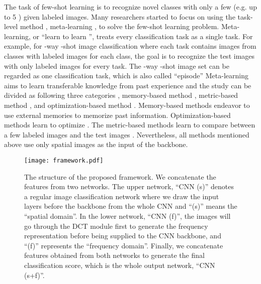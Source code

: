 \documentclass[10pt, conference, compsocconf]{IEEEtran}
\begin{document}
The task of few-shot learning is to recognize novel classes with only a few (e.g. up to 5 \cite{vinyals2016matching}) given labeled images. Many researchers started to focus on using the task-level method \cite{finn2017model,ravi2016optimization,wang2018low,sung2018learning}, meta-learning \cite{thrun2012learning}, to solve the few-shot learning problem. Meta-learning, or \enquote{learn to learn \cite{thrun2012learning}}, treats every classification task as a single task. For example, for -way -shot image classification where each task contains images from  classes with  labeled images for each class, the goal is to recognize the test images with only  labeled images for every task. The -way -shot image set can be regarded as one classification task, which is also called \enquote{episode} \cite{vinyals2016matching} Meta-learning aims to learn transferable knowledge from past experience and the study can be divided as following three categories \cite{finn2017model}, memory-based method \cite{yoo2019coloring,santoro2016meta}, metric-based method \cite{vinyals2016matching,sung2018learning,snell2017prototypical}, and optimization-based method \cite{finn2017model,ravi2016optimization}. Memory-based methods endeavor to use external memories \cite{yoo2019coloring,santoro2016meta} to memorize past information. Optimization-based methods learn to optimize \cite{finn2017model}. The metric-based methods learn to compare between a few labeled images and the test images \cite{vinyals2016matching,sung2018learning,snell2017prototypical}. Nevertheless, all methods mentioned above use only spatial images as the input of the backbone.
\begin{figure*}[tp]
\centering
\texttt{[image: framework.pdf]}\caption{The structure of the proposed framework. We concatenate the features from two networks. The upper network, \enquote{CNN (s)} denotes a regular image classification network where we draw the input layers before the backbone from the whole CNN and \enquote{(s)} means the \enquote{spatial domain}. In the lower network, \enquote{CNN (f)}, the images will go through the DCT module first to generate the frequency representation before being supplied to the CNN backbone, and \enquote{(f)} represents the \enquote{frequency domain}. Finally, we concatenate features obtained from both networks to generate the final classification score, which is the whole output network, \enquote{CNN (s+f)}.}
\label{fig1}
\end{figure*}
\end{document}
